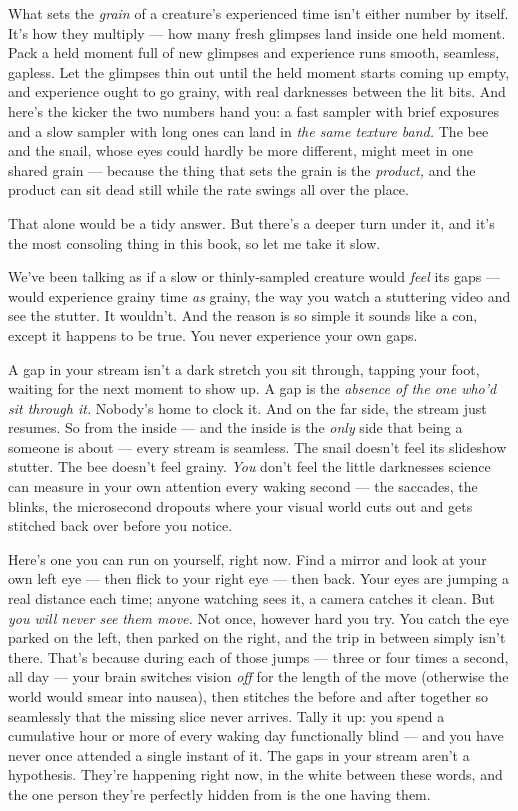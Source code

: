 \documentclass[11pt,openany]{book}
\begin{document}
What sets the \textit{grain} of a creature’s experienced time isn’t either number by itself. It’s how they multiply — how many fresh glimpses land inside one held moment. Pack a held moment full of new glimpses and experience runs smooth, seamless, gapless. Let the glimpses thin out until the held moment starts coming up empty, and experience ought to go grainy, with real darknesses between the lit bits. And here’s the kicker the two numbers hand you: a fast sampler with brief exposures and a slow sampler with long ones can land in \textit{the same texture band.} The bee and the snail, whose eyes could hardly be more different, might meet in one shared grain — because the thing that sets the grain is the \textit{product,} and the product can sit dead still while the rate swings all over the place.

That alone would be a tidy answer. But there’s a deeper turn under it, and it’s the most consoling thing in this book, so let me take it slow.

We’ve been talking as if a slow or thinly-sampled creature would \textit{feel} its gaps — would experience grainy time \textit{as} grainy, the way you watch a stuttering video and see the stutter. It wouldn’t. And the reason is so simple it sounds like a con, except it happens to be true. You never experience your own gaps.

A gap in your stream isn’t a dark stretch you sit through, tapping your foot, waiting for the next moment to show up. A gap is the \textit{absence of the one who’d sit through it.} Nobody’s home to clock it. And on the far side, the stream just resumes. So from the inside — and the inside is the \textit{only} side that being a someone is about — every stream is seamless. The snail doesn’t feel its slideshow stutter. The bee doesn’t feel grainy. \textit{You} don’t feel the little darknesses science can measure in your own attention every waking second — the saccades, the blinks, the microsecond dropouts where your visual world cuts out and gets stitched back over before you notice.

Here’s one you can run on yourself, right now. Find a mirror and look at your own left eye — then flick to your right eye — then back. Your eyes are jumping a real distance each time; anyone watching sees it, a camera catches it clean. But \textit{you will never see them move.} Not once, however hard you try. You catch the eye parked on the left, then parked on the right, and the trip in between simply isn’t there. That’s because during each of those jumps — three or four times a second, all day — your brain switches vision \textit{off} for the length of the move (otherwise the world would smear into nausea), then stitches the before and after together so seamlessly that the missing slice never arrives. Tally it up: you spend a cumulative hour or more of every waking day functionally blind — and you have never once attended a single instant of it. The gaps in your stream aren’t a hypothesis. They’re happening right now, in the white between these words, and the one person they’re perfectly hidden from is the one having them.
\end{document}
